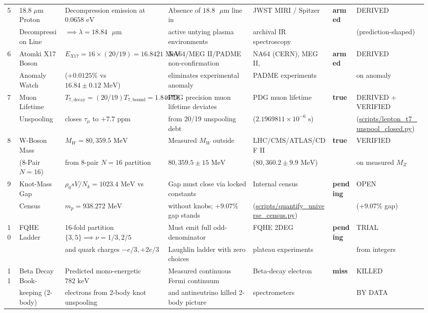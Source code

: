 \documentclass[11pt,a4paper]{article}
\begin{document}
\begin{table}[!htbp]
\begin{tabularx}{\textwidth}{C{0.45cm} L{2.0cm} Y L{2.65cm} L{2.72cm} C{1.2cm} L{2.18cm}}
5 & 18.8 $\mu\text{m}$ Proton & Decompression emission at $0.0658\text{ eV}$ & Absence of $18.8\text{ }\mu\text{m}$ line in & JWST MIRI / Spitzer & \textbf{armed} & DERIVED \\
& Decompression Line & $\implies \lambda = 18.84\text{ }\mu\text{m}$ & active untying plasma environments & archival IR spectroscopy & & (prediction-shaped) \\
6 & Atomki X17 Boson & $E_{X17} = 16 \times (20/19) = 16.8421\text{ MeV}$ & NA64/MEG II/PADME non-confirmation & NA64 (CERN), MEG II, & \textbf{armed} & DERIVED \\
& Anomaly Watch & ($+0.0125\%$ vs $16.84 \pm 0.12\text{ MeV}$) & eliminates experimental anomaly & PADME experiments & & on anomaly \\
7 & Muon Lifetime & $T_{7,\text{decay}} = (20/19)T_{7,\text{bound}} = 1.8467\%$ & PDG precision muon lifetime deviates & PDG muon lifetime & \textbf{true} & DERIVED + VERIFIED \\
& Unspooling & closes $\tau_\mu$ to $+7.7\text{ ppm}$ & from 20/19 unspooling debt & ($2.1969811 \times 10^{-6}\text{ s}$) & & (\url{scripts/lepton_t7_unspool_closed.py}) \\
8 & W-Boson Mass & $M_W = 80,359.5\text{ MeV}$ & Measured $M_W$ outside & LHC/\allowbreak CMS/\allowbreak ATLAS/\allowbreak CDF II & \textbf{true} & VERIFIED \\
& (8-Pair $N=16$) & from 8-pair $N=16$ partition & $80,359.5 \pm 15\text{ MeV}$ & ($80,360.2 \pm 9.9\text{ MeV}$) & & on measured $M_Z$ \\
9 & Knot-Mass Gap & $\rho_0 s V / N_k = 1023.4\text{ MeV}$ vs & Gap must close via locked constants & Internal census & \textbf{pending} & OPEN \\
& Census & $m_p = 938.272\text{ MeV}$ & without knobs; $+9.07\%$ gap stands & (\url{scripts/quantify_universe_census.py}) & & (+9.07\% gap) \\
10 & FQHE Ladder & 16-fold partition $\{3, 5\} \implies \nu = 1/3, 2/5$ & Must emit full odd-denominator & FQHE 2DEG & \textbf{pending} & TRIAL \\
& & and quark charges $-e/3, +2e/3$ & Laughlin ladder with zero choices & plateau experiments & & from integers \\
11 & Beta Decay Book- & Predicted mono-energetic $782\text{ keV}$ & Measured continuous Fermi continuum & Beta-decay electron & \textbf{miss} & KILLED \\
& keeping (2-body) & electrons from 2-body knot unspooling & and antineutrino killed 2-body picture & spectrometers & & BY DATA \\
\bottomrule
\end{tabularx}
\end{table}
\end{document}
